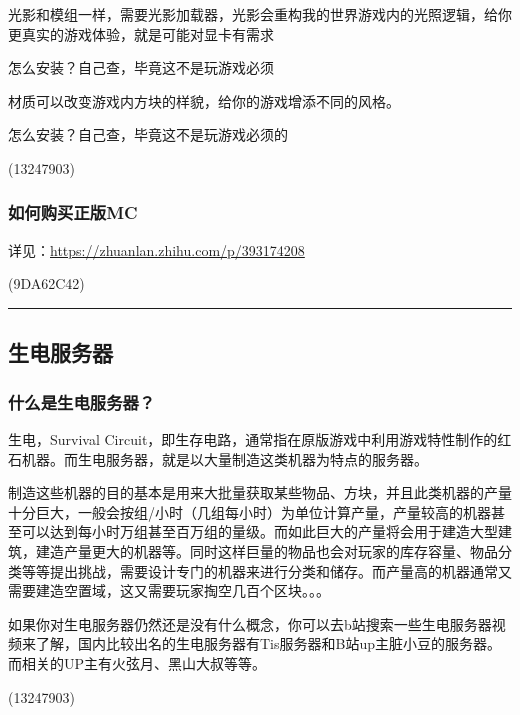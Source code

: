 \documentclass[
]{article}
\begin{document}
光影和模组一样，需要光影加载器，光影会重构我的世界游戏内的光照逻辑，给你更真实的游戏体验，就是可能对显卡有需求

怎么安装？自己查，毕竟这不是玩游戏必须

材质可以改变游戏内方块的样貌，给你的游戏增添不同的风格。

怎么安装？自己查，毕竟这不是玩游戏必须的

\begin{flushright}(13247903)\end{flushright}

\subsubsection{如何购买正版MC}\label{mc}

详见：\url{https://zhuanlan.zhihu.com/p/393174208}

\begin{flushright}(9DA62C42)\end{flushright}

\begin{center}\rule{0.5\linewidth}{0.5pt}\end{center}

\subsection{生电服务器}\label{section-7}

\subsubsection{什么是生电服务器？}\label{section-8}

生电，Survival
Circuit，即生存电路，通常指在原版游戏中利用游戏特性制作的红石机器。而生电服务器，就是以大量制造这类机器为特点的服务器。

制造这些机器的目的基本是用来大批量获取某些物品、方块，并且此类机器的产量十分巨大，一般会按组/小时（几组每小时）为单位计算产量，产量较高的机器甚至可以达到每小时万组甚至百万组的量级。而如此巨大的产量将会用于建造大型建筑，建造产量更大的机器等。同时这样巨量的物品也会对玩家的库存容量、物品分类等等提出挑战，需要设计专门的机器来进行分类和储存。而产量高的机器通常又需要建造空置域，这又需要玩家掏空几百个区块。。。

如果你对生电服务器仍然还是没有什么概念，你可以去b站搜索一些生电服务器视频来了解，国内比较出名的生电服务器有Tis服务器和B站up主脏小豆的服务器。而相关的UP主有火弦月、黑山大叔等等。

\begin{flushright}(13247903)\end{flushright}
\end{document}
